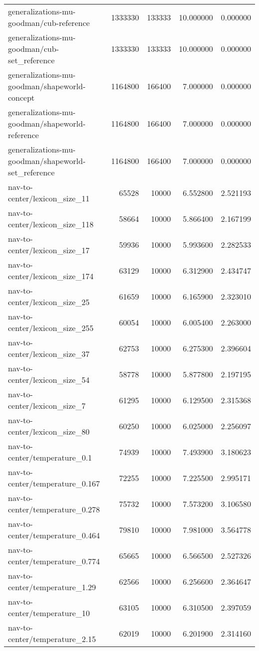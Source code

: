 \begin{tabular}{lrrrr}
generalizations-mu-goodman/cub-reference & 1333330 & 133333 & 10.000000 & 0.000000 \\
generalizations-mu-goodman/cub-set\_reference & 1333330 & 133333 & 10.000000 & 0.000000 \\
generalizations-mu-goodman/shapeworld-concept & 1164800 & 166400 & 7.000000 & 0.000000 \\
generalizations-mu-goodman/shapeworld-reference & 1164800 & 166400 & 7.000000 & 0.000000 \\
generalizations-mu-goodman/shapeworld-set\_reference & 1164800 & 166400 & 7.000000 & 0.000000 \\
nav-to-center/lexicon\_size\_11 & 65528 & 10000 & 6.552800 & 2.521193 \\
nav-to-center/lexicon\_size\_118 & 58664 & 10000 & 5.866400 & 2.167199 \\
nav-to-center/lexicon\_size\_17 & 59936 & 10000 & 5.993600 & 2.282533 \\
nav-to-center/lexicon\_size\_174 & 63129 & 10000 & 6.312900 & 2.434747 \\
nav-to-center/lexicon\_size\_25 & 61659 & 10000 & 6.165900 & 2.323010 \\
nav-to-center/lexicon\_size\_255 & 60054 & 10000 & 6.005400 & 2.263000 \\
nav-to-center/lexicon\_size\_37 & 62753 & 10000 & 6.275300 & 2.396604 \\
nav-to-center/lexicon\_size\_54 & 58778 & 10000 & 5.877800 & 2.197195 \\
nav-to-center/lexicon\_size\_7 & 61295 & 10000 & 6.129500 & 2.315368 \\
nav-to-center/lexicon\_size\_80 & 60250 & 10000 & 6.025000 & 2.256097 \\
nav-to-center/temperature\_0.1 & 74939 & 10000 & 7.493900 & 3.180623 \\
nav-to-center/temperature\_0.167 & 72255 & 10000 & 7.225500 & 2.995171 \\
nav-to-center/temperature\_0.278 & 75732 & 10000 & 7.573200 & 3.106580 \\
nav-to-center/temperature\_0.464 & 79810 & 10000 & 7.981000 & 3.564778 \\
nav-to-center/temperature\_0.774 & 65665 & 10000 & 6.566500 & 2.527326 \\
nav-to-center/temperature\_1.29 & 62566 & 10000 & 6.256600 & 2.364647 \\
nav-to-center/temperature\_10 & 63105 & 10000 & 6.310500 & 2.397059 \\
nav-to-center/temperature\_2.15 & 62019 & 10000 & 6.201900 & 2.314160 \\

\end{tabular}
